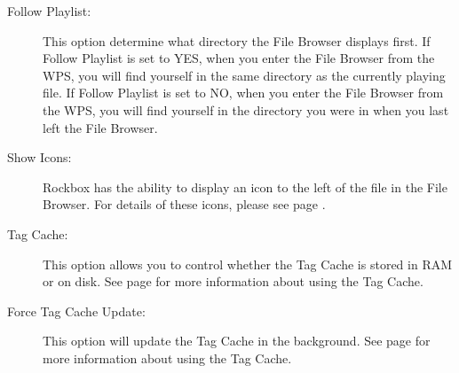 \begin{description}
  \item[Follow Playlist:]
    This option determine what directory the File Browser displays first.  
    If Follow Playlist is set to YES, when you enter the File Browser from 
    the WPS, you will find yourself in the same directory as the currently 
    playing file.  If Follow Playlist is set to NO, when you enter the File 
    Browser from the WPS, you will find yourself in the directory you were 
    in when you last left the File Browser.
    
  \item[Show Icons:]
    Rockbox has the ability to display an icon to the left of the file 
    in the File Browser.  For details of these icons, please see page 
    \pageref{ref:Supportedfileformats}.
    
  \item[Tag Cache: ]This option allows you to control whether the Tag Cache is stored
    in RAM or on disk.  See page \pageref{ref:tagcache} for more information about using
    the Tag Cache.
      
  \item[Force Tag Cache Update: ]This option will update the Tag Cache in the background.  
    See page \pageref{ref:tagcache} for more information about using the Tag Cache.
  \end{description}
